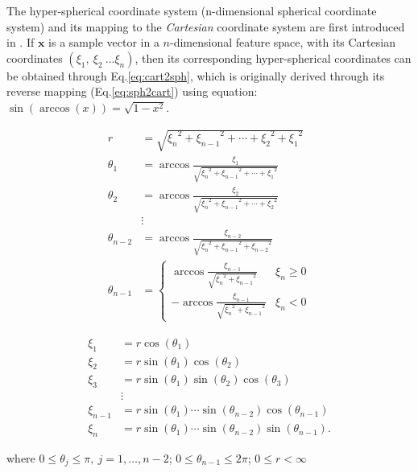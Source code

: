 The hyper-spherical coordinate system (n-dimensional spherical coordinate system) and its mapping to the \textit{Cartesian} coordinate system are first introduced in \cite{nsphere}. If $\mathbf{x}$ is a sample vector in 
a $n$-dimensional feature space, with its Cartesian coordinates $(\xi_1,~\xi_2~... \xi_n)$, then its corresponding hyper-spherical coordinates can be obtained through Eq.\ref{eq:cart2sph}, which is originally derived through its reverse mapping (Eq.\ref{eq:sph2cart}) using equation: $\sin(\arccos(x)) = \sqrt{1-x^2}$.



\begin{align}
\label{eq:cart2sph}
\nonumber
r      &= \sqrt{{\xi_n}^2 + {\xi_{n-1}}^2 + \cdots + {\xi_2}^2 + {\xi_1}^2} \\
\nonumber
\theta_1 &= \arccos \frac{\xi_{1}}{\sqrt{{\xi_n}^2+{\xi_{n-1}}^2+\cdots+{\xi_1}^2}} \\
\nonumber
 \theta_2 &= \arccos \frac{\xi_{2}}{\sqrt{{\xi_n}^2+{\xi_{n-1}}^2+\cdots+{\xi_2}^2}} \\
\nonumber
        &\vdots\\
\nonumber
 \theta_{n-2} &=\arccos \frac{\xi_{n-2}}{\sqrt{{\xi_n}^2+{\xi_{n-1}}^2+{\xi_{n-2}}^2}} \\
 \theta_{n-1} &= 
 \begin{cases}
     \arccos \frac{\xi_{n-1}}{\sqrt{{\xi_n}^2+{\xi_{n-1}}^2}} & \xi_n\geq 0 \\
     - \arccos \frac{\xi_{n-1}}{\sqrt{{\xi_n}^2+{\xi_{n-1}}^2}} & \xi_n < 0
 \end{cases} 
\end{align}


\begin{align}
\label{eq:sph2cart}
\nonumber
\xi_1 &= r \cos(\theta_1) \\
\nonumber
\xi_2 &= r \sin(\theta_1) \cos(\theta_2) \\
\nonumber
\xi_3 &= r \sin(\theta_1) \sin(\theta_2) \cos(\theta_3) \\
\nonumber
    &\vdots\\
\nonumber
\xi_{n-1} &= r \sin(\theta_1) \cdots \sin(\theta_{n-2}) \cos(\theta_{n-1}) \\
\xi_n &= r \sin(\theta_1) \cdots \sin(\theta_{n-2}) \sin(\theta_{n-1}).
\end{align}


where $0\leq \theta_j\leq\pi,~j=1,\dots ,n-2$; $0\leq \theta_{n-1}\leq 2 \pi$; $0\leq r<\infty$
 
